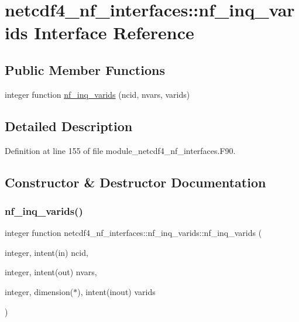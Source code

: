 \hypertarget{interfacenetcdf4__nf__interfaces_1_1nf__inq__varids}{}\section{netcdf4\+\_\+nf\+\_\+interfaces\+:\+:nf\+\_\+inq\+\_\+varids Interface Reference}
\label{interfacenetcdf4__nf__interfaces_1_1nf__inq__varids}
\subsection*{Public Member Functions}
\begin{DoxyCompactItemize}
\item 
integer function \hyperlink{interfacenetcdf4__nf__interfaces_1_1nf__inq__varids_a6c363451d304ddf790a7b0f0e1d82e58}{nf\+\_\+inq\+\_\+varids} (ncid, nvars, varids)
\end{DoxyCompactItemize}


\subsection{Detailed Description}


Definition at line 155 of file module\+\_\+netcdf4\+\_\+nf\+\_\+interfaces.\+F90.



\subsection{Constructor \& Destructor Documentation}
\mbox{\label{interfacenetcdf4__nf__interfaces_1_1nf__inq__varids_a6c363451d304ddf790a7b0f0e1d82e58}} 
\subsubsection{\texorpdfstring{nf\+\_\+inq\+\_\+varids()}{nf\_inq\_varids()}}
{\footnotesize\ttfamily integer function netcdf4\+\_\+nf\+\_\+interfaces\+::nf\+\_\+inq\+\_\+varids\+::nf\+\_\+inq\+\_\+varids (\begin{DoxyParamCaption}\item[{integer, intent(in)}]{ncid,  }\item[{integer, intent(out)}]{nvars,  }\item[{integer, dimension($\ast$), intent(inout)}]{varids }\end{DoxyParamCaption})}



